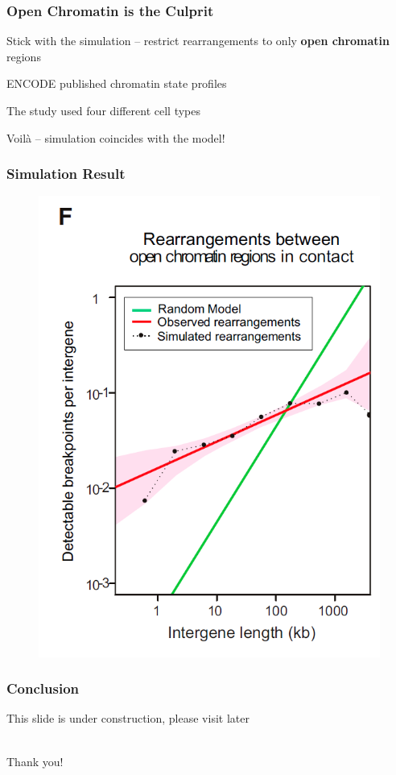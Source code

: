\documentclass[svgnames,14pt]{beamer}
\begin{document}
\begin{frame}
\frametitle{Open Chromatin is the Culprit}
Stick with the simulation -- restrict rearrangements to only \textbf{open chromatin} regions
\vspace{12pt}

ENCODE published chromatin state profiles
\vspace{12pt}

The study used four different cell types
\vspace{12pt}

\pause
Voilà -- simulation coincides with the model!
\end{frame}

\begin{frame}
\frametitle{Simulation Result}
\begin{figure}
	\centering
	\includegraphics[scale = .38]{SimResult3.png}
\end{figure}
\end{frame}


\begin{frame}
\frametitle{Conclusion}
This slide is under construction, please visit later
\end{frame}

\begin{frame}
\begin{center}
\hfill \huge \\
Thank you!
\end{center}
\end{frame}
\end{document}
